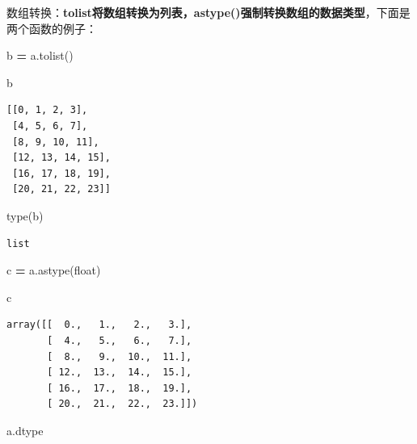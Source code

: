 \documentclass[]{article}
\newenvironment{Shaded}{\begin{snugshade}}{\end{snugshade}}
\newcommand{\OperatorTok}[1]{\textcolor[rgb]{0.81,0.36,0.00}{\textbf{#1}}}
\newcommand{\BuiltInTok}[1]{#1}
\newcommand{\NormalTok}[1]{#1}
\begin{document}
数组转换：\textbf{tolist将数组转换为列表，astype()强制转换数组的数据类型}，下面是两个函数的例子：

\begin{Shaded}
\begin{Highlighting}[]
\NormalTok{b }\OperatorTok{=}\NormalTok{ a.tolist()}
\end{Highlighting}
\end{Shaded}

\begin{Shaded}
\begin{Highlighting}[]
\NormalTok{b}
\end{Highlighting}
\end{Shaded}

\begin{verbatim}
[[0, 1, 2, 3],
 [4, 5, 6, 7],
 [8, 9, 10, 11],
 [12, 13, 14, 15],
 [16, 17, 18, 19],
 [20, 21, 22, 23]]
\end{verbatim}

\begin{Shaded}
\begin{Highlighting}[]
\BuiltInTok{type}\NormalTok{(b)}
\end{Highlighting}
\end{Shaded}

\begin{verbatim}
list
\end{verbatim}

\begin{Shaded}
\begin{Highlighting}[]
\NormalTok{c }\OperatorTok{=}\NormalTok{ a.astype(}\BuiltInTok{float}\NormalTok{)}
\end{Highlighting}
\end{Shaded}

\begin{Shaded}
\begin{Highlighting}[]
\NormalTok{c}
\end{Highlighting}
\end{Shaded}

\begin{verbatim}
array([[  0.,   1.,   2.,   3.],
       [  4.,   5.,   6.,   7.],
       [  8.,   9.,  10.,  11.],
       [ 12.,  13.,  14.,  15.],
       [ 16.,  17.,  18.,  19.],
       [ 20.,  21.,  22.,  23.]])
\end{verbatim}

\begin{Shaded}
\begin{Highlighting}[]
\NormalTok{a.dtype}
\end{Highlighting}
\end{Shaded}
\end{document}
